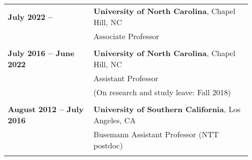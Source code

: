 \documentclass[10pt]{article}
\begin{document}
\smallskip

{
\begin{tabular}{l l}
{\bf July 2022 -- } & {\bf University of North Carolina}, Chapel Hill, NC \\
& {Associate Professor}\\ \\

{\bf July 2016 -- June 2022} & {\bf University of North Carolina}, Chapel Hill, NC \\
& {Assistant Professor}\\ 
& {(On research and study leave: Fall 2018)}\\ \\

{\bf August 2012 -- July 2016} & {\bf University of Southern California}, Los Angeles, CA \\
& {Busemann Assistant Professor (NTT postdoc)}\\
\\
\end{tabular}
}


%
%
%
\end{document}
